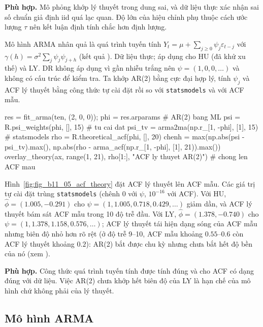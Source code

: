  \textbf{Phù hợp.} Mô phỏng khớp lý thuyết trong dung sai, và dữ liệu thực xác nhận sai số chuẩn giả định iid quá lạc quan. Độ lớn của hiệu chỉnh phụ thuộc cách ước lượng $\tau$ nên kết luận định tính chắc hơn định lượng.

 Mô hình ARMA nhân quả là quá trình tuyến tính $Y_t=\mu+\sum_{j\ge0}\psi_j\varepsilon_{t-j}$ với $\gamma(h)=\sigma^2\sum_j\psi_j\psi_{j+h}$ (kết quả ).
 Dữ liệu thực; áp dụng cho HU (đã khử xu thế) và LY. DR không áp dụng vì gần nhiễu trắng nên $\psi=(1,0,0,\dots)$ và không có cấu trúc để kiểm tra. Ta khớp AR(2) bằng cực đại hợp lý, tính $\psi_j$ và ACF lý thuyết bằng công thức tự cài đặt rồi so với \texttt{statsmodels} và với ACF mẫu.
\begin{codeblock}
res = fit_arma(ten, (2, 0, 0)); phi = res.arparams           # AR(2) bang ML
psi = R.psi_weights(phi, [], 15)                              # tu cai dat
psi_tv = arma2ma(np.r_[1, -phi], [1], 15)                     # statsmodels
rho = R.theoretical_acf(phi, [], 20)
chenh = max(np.abs(psi - psi_tv).max(), np.abs(rho - arma_acf(np.r_[1, -phi], [1], 21)).max())
overlay_theory(ax, range(1, 21), rho[1:], "ACF ly thuyet AR(2)")     # chong len ACF mau
\end{codeblock}
 Hình~\ref{fig:fig_b11_05_acf_theory} đặt ACF lý thuyết lên ACF mẫu.
 Các giá trị tự cài đặt trùng \texttt{statsmodels} (chênh $0$ với $\psi$, $10^{-16}$ với ACF). Với HU, $\hat\phi=(1.005,-0.291)$ cho $\psi=(1,1.005,0.718,0.429,\dots)$ giảm dần, và ACF lý thuyết bám sát ACF mẫu trong 10 độ trễ đầu. Với LY, $\hat\phi=(1.378,-0.740)$ cho $\psi=(1,1.378,1.158,0.576,\dots)$; ACF lý thuyết tái hiện dạng sóng của ACF mẫu nhưng biên độ nhỏ hơn rõ rệt (ở độ trễ 9--10, ACF mẫu khoảng $0.55$--$0.6$ còn ACF lý thuyết khoảng $0.2$): AR(2) bắt được chu kỳ nhưng chưa bắt hết độ bền của nó (xem ).

 \textbf{Phù hợp.} Công thức quá trình tuyến tính được tính đúng và cho ACF có dạng đúng với dữ liệu. Việc AR(2) chưa khớp hết biên độ của LY là hạn chế của mô hình chứ không phải của lý thuyết.

\subsection{Mô hình ARMA}


